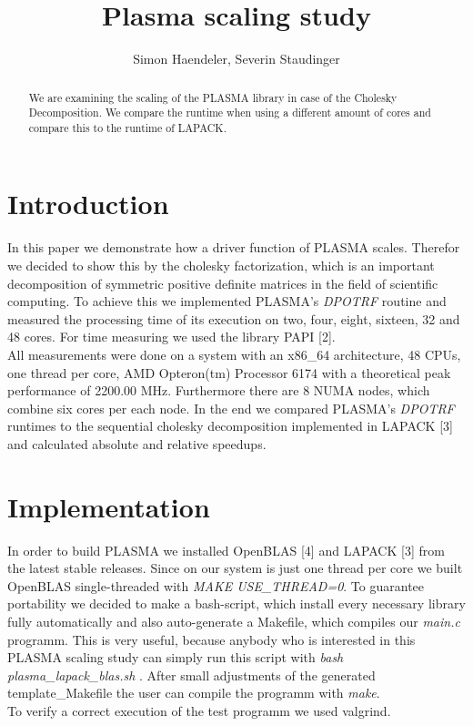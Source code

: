 \documentclass[a4paper,final,ngerman,english]{article}
\begin{document}
\lstset{postbreak=\space,breakindent=5pt,breaklines,basicstyle=\scriptsize,frame=trbl,label=DescriptiveLabel} %
\pagestyle{headings}
%
\title{Plasma scaling study}
\author{Simon Haendeler, Severin Staudinger}
\maketitle
%
\begin{abstract}
	We are examining the scaling of the PLASMA library in case of the Cholesky Decomposition.
	We compare the runtime when using a different amount of cores and compare this to the runtime
	of LAPACK\@.
\end{abstract}
\section{Introduction}
In this paper we demonstrate how a driver function of PLASMA \cite{plasma01} scales.
Therefor we decided to show this by the cholesky factorization, which is an important decomposition of symmetric positive definite matrices in the field of scientific computing.
To achieve this we implemented PLASMA's \textit{DPOTRF} routine and measured the processing time of its execution on two, four, eight, sixteen, 32 and 48 cores. For time measuring we used the library PAPI [2].\\
All measurements were done on a system with an x86\_64 architecture, 48 CPUs, one thread per core, AMD Opteron(tm) Processor 6174 with a theoretical peak performance of 2200.00 MHz. Furthermore there are 8 NUMA nodes, which combine six cores per each node.
In the end we compared PLASMA's \textit{DPOTRF} runtimes to the sequential cholesky decomposition implemented in LAPACK [3] and calculated absolute and relative speedups.

\section{Implementation}
In order to build PLASMA we installed OpenBLAS [4] and LAPACK [3] from the latest stable releases.
Since on our system is just one thread per core we built OpenBLAS single-threaded with \textit{MAKE USE\_THREAD=0}.
To guarantee portability we decided to make a bash-script, which install every necessary library fully automatically and also auto-generate a Makefile, which compiles our \textit{main.c} programm.
This is very useful, because anybody who is interested in this PLASMA scaling study can simply run this script with \textit{bash plasma\_lapack\_blas.sh} .
After small adjustments of the generated template\_Makefile the user can compile the programm with \textit{make}.
\\
To verify a correct execution of the test programm we used valgrind.
\end{document}
